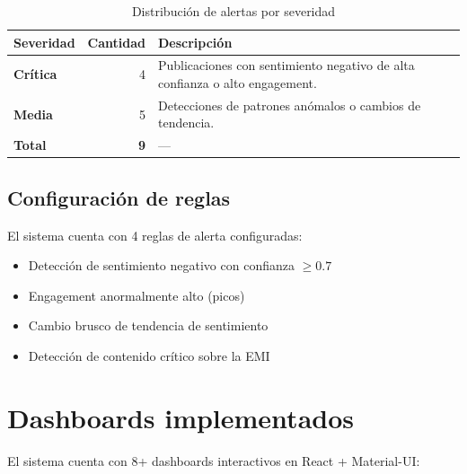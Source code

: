 \documentclass[11pt,a4paper]{article}
\begin{document}
\begin{table}[H]
\centering
\begin{tabularx}{\textwidth}{l r X}
\toprule
\textbf{Severidad} & \textbf{Cantidad} & \textbf{Descripción} \\
\midrule
\textcolor{dangerred}{\textbf{Crítica}} & 4 & Publicaciones con sentimiento negativo de alta confianza o alto engagement. \\
\rowcolor{tablerow}
\textcolor{warningorange}{\textbf{Media}} & 5 & Detecciones de patrones anómalos o cambios de tendencia. \\
\midrule
\textbf{Total} & \textbf{9} & — \\
\bottomrule
\end{tabularx}
\caption{Distribución de alertas por severidad}
\end{table}

\subsection{Configuración de reglas}
El sistema cuenta con 4 reglas de alerta configuradas:
\begin{itemize}
  \item Detección de sentimiento negativo con confianza $\geq 0.7$
  \item Engagement anormalmente alto (picos)
  \item Cambio brusco de tendencia de sentimiento
  \item Detección de contenido crítico sobre la EMI
\end{itemize}

\section{Dashboards implementados}

El sistema cuenta con 8+ dashboards interactivos en React + Material-UI:
\end{document}
